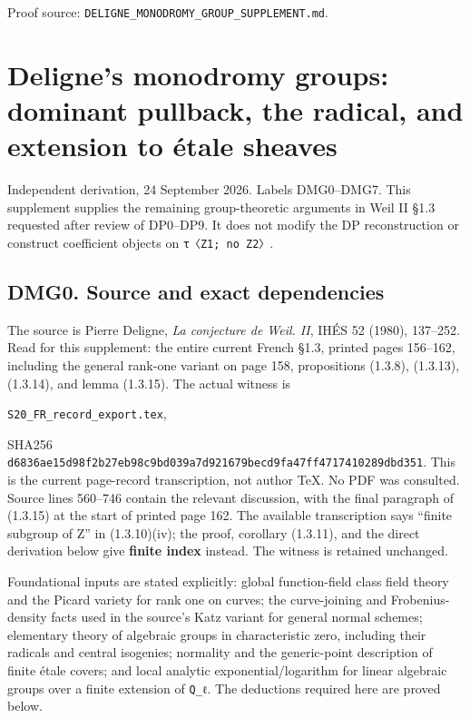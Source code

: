 \documentclass[
]{report}
\begin{document}
Proof source: \nolinkurl{DELIGNE_MONODROMY_GROUP_SUPPLEMENT.md}.

\chapter{Deligne's monodromy groups: dominant pullback, the radical, and
extension to étale
sheaves}\label{delignes-monodromy-groups-dominant-pullback-the-radical-and-extension-to-uxe9tale-sheaves}

Independent derivation, 24 September 2026. Labels DMG0--DMG7. This
supplement supplies the remaining group-theoretic arguments in Weil II
§1.3 requested after review of DP0--DP9. It does not modify the DP
reconstruction or construct coefficient objects on
\texttt{τ〈Z1;\ no\ Z2〉}.

\section{DMG0. Source and exact
dependencies}\label{dmg0.-source-and-exact-dependencies}

The source is Pierre Deligne, \emph{La conjecture de Weil. II}, IHÉS 52
(1980), 137--252. Read for this supplement: the entire current French
§1.3, printed pages 156--162, including the general rank-one variant on
page 158, propositions (1.3.8), (1.3.13), (1.3.14), and lemma (1.3.15).
The actual witness is

\texttt{S20\_FR\_record\_export.tex},

SHA256
\nolinkurl{d6836ae15d98f2b27eb98c9bd039a7d921679becd9fa47ff4717410289dbd351}.
This is the current page-record transcription, not author TeX. No PDF
was consulted. Source lines 560--746 contain the relevant discussion,
with the final paragraph of (1.3.15) at the start of printed page 162.
The available transcription says ``finite subgroup of Z'' in
(1.3.10)(iv); the proof, corollary (1.3.11), and the direct derivation
below give \textbf{finite index} instead. The witness is retained
unchanged.

Foundational inputs are stated explicitly: global function-field class
field theory and the Picard variety for rank one on curves; the
curve-joining and Frobenius-density facts used in the source's Katz
variant for general normal schemes; elementary theory of algebraic
groups in characteristic zero, including their radicals and central
isogenies; normality and the generic-point description of finite étale
covers; and local analytic exponential/logarithm for linear algebraic
groups over a finite extension of \texttt{Q\_ℓ}. The deductions required
here are proved below.
\end{document}
